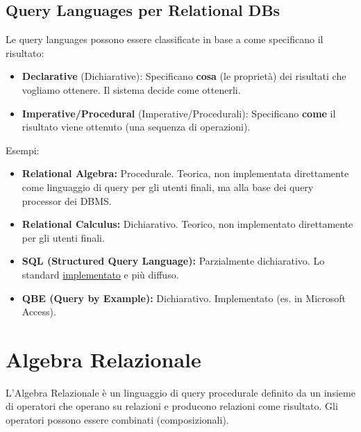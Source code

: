 \documentclass{article}
\begin{document}
	\subsection{Query Languages per Relational DBs}
	Le query languages possono essere classificate in base a come specificano il risultato:
	\begin{itemize}
		\item \textbf{Declarative} (Dichiarative): Specificano \textbf{cosa} (le proprietà) dei risultati che vogliamo ottenere. Il sistema decide come ottenerli.
		\item \textbf{Imperative/Procedural} (Imperative/Procedurali): Specificano \textbf{come} il risultato viene ottenuto (una sequenza di operazioni).
	\end{itemize}
	Esempi:
	\begin{itemize}
		\item \textbf{Relational Algebra:} Procedurale. Teorica, non implementata direttamente come linguaggio di query per gli utenti finali, ma alla base dei query processor dei DBMS.
		\item \textbf{Relational Calculus:} Dichiarativo. Teorico, non implementato direttamente per gli utenti finali.
		\item \textbf{SQL (Structured Query Language):} Parzialmente dichiarativo. Lo standard \underline{implementato} e più diffuso.
		\item \textbf{QBE (Query by Example):} Dichiarativo. Implementato (es. in Microsoft Access).
	\end{itemize}
	
	\section{Algebra Relazionale}
	
	L'Algebra Relazionale è un linguaggio di query procedurale definito da un insieme di operatori che operano su relazioni e producono relazioni come risultato. Gli operatori possono essere combinati (composizionali).
	
\end{document}
